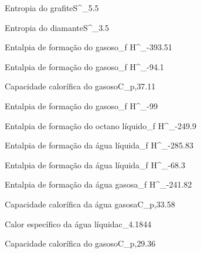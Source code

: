 {Entropia do grafite}{S^{\standardstate}_{}}{5.5}{\joule\per\kelvin\per\mol}

{Entropia do diamante}{S^{\standardstate}_{}}{3.5}{\joule\per\kelvin\per\mol}

{Entalpia de formação do  gasoso}{\Delta_{f} H^{\standardstate}_{}}{-393.51}{\kilo\joule\per\mol}

{Entalpia de formação do  gasoso}{\Delta_{f} H^{\standardstate}_{}}{-94.1}{\kilo\cal\per\mol}

{Capacidade calorífica do  gasoso}{C_{p,}}{37.11}{\joule\per\mol\per\kelvin}


{Entalpia de formação do  gasoso}{\Delta_{f} H^{\standardstate}_{}}{-99}{\kilo\joule\per\mol}


{Entalpia de formação do octano líquido}{\Delta_{f} H^{\standardstate}_{}}{-249.9}{\kilo\joule\per\mol}



{Entalpia de formação da água líquida}{\Delta_{f} H^{\standardstate}_{}}{-285.83}{\kilo\joule\per\mol}

{Entalpia de formação da água líquida}{\Delta_{f} H^{\standardstate}_{}}{-68.3}{\kilo\cal\per\mol}

{Entalpia de formação da água gasosa}{\Delta_{f} H^{\standardstate}_{}}{-241.82}{\kilo\joule\per\mol}

{Capacidade calorífica da água gasosa}{C_{p,}}{33.58}{\joule\per\mol\per\kelvin}

{Calor específico da água líquida}{c_{}}{4.1844}{\joule\per\gram\per\kelvin}



{Capacidade calorífica do  gasoso}{C_{p,}}{29.36}{\joule\per\mol\per\kelvin}

